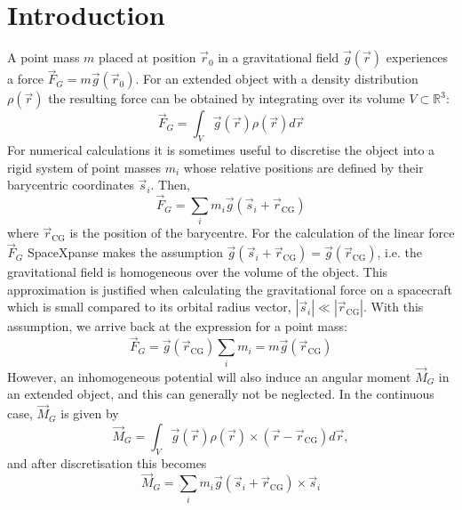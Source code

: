 \documentclass[a4paper]{article}
\begin{document}



\newcommand{\vR}[1]{\ensuremath{\vec{R}_{#1}}}
\newcommand{\nR}[1]{\ensuremath{|\vR{#1}|}}
\newcommand{\mat}[1]{\ensuremath{\mathsf{#1}}}

\maketitle

\section{Introduction}
A point mass $m$ placed at position $\vec{r}_0$ in a gravitational field $\vec{g}(\vec{r})$ experiences a force $\vec{F}_G = m\vec{g}(\vec{r}_0)$.
For an extended object with a density distribution $\rho(\vec{r})$ the resulting force can be obtained by integrating over its volume $V \subset \mathbb{R}^3$:
\begin{equation*}
\vec{F}_G = \int_V \vec{g}(\vec{r})\rho(\vec{r}) d\vec{r}
\end{equation*}
For numerical calculations it is sometimes useful to discretise the object into a rigid system of point masses $m_i$ whose relative positions are defined by their barycentric coordinates $\vec{s}_i$. Then,
\begin{equation*}
\vec{F}_G = \sum_i m_i \vec{g}(\vec{s}_i+\vec{r}_\text{CG})
\end{equation*}
where $\vec{r}_\text{CG}$ is the position of the barycentre. For the calculation of the linear force $\vec{F}_G$ SpaceXpanse makes the assumption $\vec{g}(\vec{s}_i + \vec{r}_\text{CG}) = \vec{g}(\vec{r}_\text{CG})$, i.e. the gravitational field is homogeneous over the volume of the object. This approximation is justified when calculating the gravitational force on a spacecraft which is small compared to its orbital radius vector, $|\vec{s}_i| \ll |\vec{r}_\text{CG}|$. With this assumption, we arrive back at the expression for a point mass:
\begin{equation*}
\vec{F}_G = \vec{g}(\vec{r}_\text{CG}) \sum_i m_i = m \vec{g}(\vec{r}_\text{CG})
\end{equation*}
However, an inhomogeneous potential will also induce an angular moment $\vec{M}_G$ in an extended object, and this can generally not be neglected.
In the continuous case, $\vec{M}_G$ is given by
\begin{equation}\label{eq:cont_torque}
\vec{M}_G = \int_V \vec{g}(\vec{r}) \rho(\vec{r}) \times (\vec{r}-\vec{r}_\text{CG}) d\vec{r},
\end{equation}
and after discretisation this becomes
\begin{equation}\label{eq:torque}
\vec{M}_G = \sum_i m_i \vec{g}(\vec{s}_i + \vec{r}_\text{CG}) \times \vec{s}_i
\end{equation}
\end{document}
